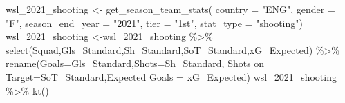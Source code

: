 \documentclass[
  11pt,
]{book}
\newenvironment{Shaded}{\begin{snugshade}}{\end{snugshade}}
\newcommand{\AttributeTok}[1]{\textcolor[rgb]{0.77,0.63,0.00}{#1}}
\newcommand{\FunctionTok}[1]{\textcolor[rgb]{0.00,0.00,0.00}{#1}}
\newcommand{\NormalTok}[1]{#1}
\newcommand{\OtherTok}[1]{\textcolor[rgb]{0.56,0.35,0.01}{#1}}
\newcommand{\SpecialCharTok}[1]{\textcolor[rgb]{0.00,0.00,0.00}{#1}}
\newcommand{\StringTok}[1]{\textcolor[rgb]{0.31,0.60,0.02}{#1}}
\theoremstyle{definition}
\theoremstyle{definition}
\theoremstyle{definition}
\theoremstyle{definition}
\theoremstyle{remark}
\begin{document}
\begin{Shaded}
\begin{Highlighting}[]
\NormalTok{wsl\_2021\_shooting }\OtherTok{\textless{}{-}} \FunctionTok{get\_season\_team\_stats}\NormalTok{(}
  \AttributeTok{country =} \StringTok{"ENG"}\NormalTok{, }\AttributeTok{gender =} \StringTok{"F"}\NormalTok{, }\AttributeTok{season\_end\_year =} \StringTok{"2021"}\NormalTok{, }
  \AttributeTok{tier =} \StringTok{"1st"}\NormalTok{, }\AttributeTok{stat\_type =} \StringTok{"shooting"}\NormalTok{)}
\NormalTok{wsl\_2021\_shooting }\OtherTok{\textless{}{-}}\NormalTok{wsl\_2021\_shooting }\SpecialCharTok{\%\textgreater{}\%} 
  \FunctionTok{select}\NormalTok{(Squad,Gls\_Standard,Sh\_Standard,SoT\_Standard,xG\_Expected) }\SpecialCharTok{\%\textgreater{}\%} 
  \FunctionTok{rename}\NormalTok{(}\AttributeTok{Goals=}\NormalTok{Gls\_Standard,}\AttributeTok{Shots=}\NormalTok{Sh\_Standard,}
         \StringTok{\textasciigrave{}}\AttributeTok{Shots on Target}\StringTok{\textasciigrave{}}\OtherTok{=}\NormalTok{SoT\_Standard,}\StringTok{\textasciigrave{}}\AttributeTok{Expected Goals}\StringTok{\textasciigrave{}} \OtherTok{=}\NormalTok{ xG\_Expected)}
\NormalTok{wsl\_2021\_shooting }\SpecialCharTok{\%\textgreater{}\%} \FunctionTok{kt}\NormalTok{()}
\end{Highlighting}
\end{Shaded}
\end{document}
